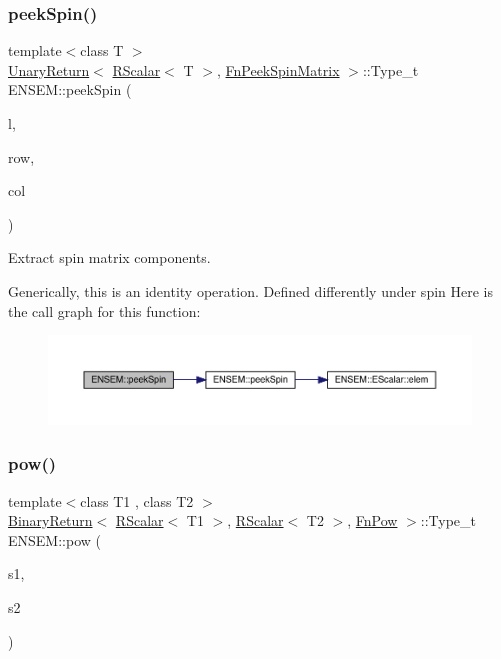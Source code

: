 \subsubsection{\texorpdfstring{peekSpin()}{peekSpin()}\hspace{0.1cm}{\footnotesize\ttfamily [2/2]}}
{\footnotesize\ttfamily template$<$class T $>$ \\
\mbox{\hyperlink{structENSEM_1_1UnaryReturn}{Unary\+Return}}$<$ \mbox{\hyperlink{classENSEM_1_1RScalar}{R\+Scalar}}$<$ T $>$, \mbox{\hyperlink{structENSEM_1_1FnPeekSpinMatrix}{Fn\+Peek\+Spin\+Matrix}} $>$\+::Type\+\_\+t E\+N\+S\+E\+M\+::peek\+Spin (\begin{DoxyParamCaption}\item[{const \mbox{\hyperlink{classENSEM_1_1RScalar}{R\+Scalar}}$<$ T $>$ \&}]{l,  }\item[{int}]{row,  }\item[{int}]{col }\end{DoxyParamCaption})\hspace{0.3cm}{\ttfamily [inline]}}



Extract spin matrix components. 

Generically, this is an identity operation. Defined differently under spin Here is the call graph for this function\+:\nopagebreak
\begin{figure}[H]
\begin{center}
\leavevmode
\includegraphics[width=350pt]{d9/ded/group__rscalar_gafc1d2e7916b4f394f3c5aa75ce62b421_cgraph}
\end{center}
\end{figure}
\mbox{\label{group__rscalar_gae9777be3e406f64a9a70f5a97526102a}} 
\subsubsection{\texorpdfstring{pow()}{pow()}}
{\footnotesize\ttfamily template$<$class T1 , class T2 $>$ \\
\mbox{\hyperlink{structENSEM_1_1BinaryReturn}{Binary\+Return}}$<$ \mbox{\hyperlink{classENSEM_1_1RScalar}{R\+Scalar}}$<$ T1 $>$, \mbox{\hyperlink{classENSEM_1_1RScalar}{R\+Scalar}}$<$ T2 $>$, \mbox{\hyperlink{structENSEM_1_1FnPow}{Fn\+Pow}} $>$\+::Type\+\_\+t E\+N\+S\+E\+M\+::pow (\begin{DoxyParamCaption}\item[{const \mbox{\hyperlink{classENSEM_1_1RScalar}{R\+Scalar}}$<$ T1 $>$ \&}]{s1,  }\item[{const \mbox{\hyperlink{classENSEM_1_1RScalar}{R\+Scalar}}$<$ T2 $>$ \&}]{s2 }\end{DoxyParamCaption})\hspace{0.3cm}{\ttfamily [inline]}}




